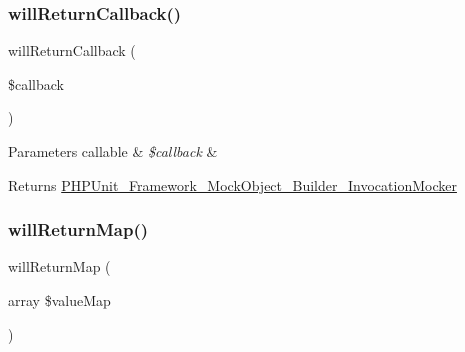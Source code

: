 \subsubsection{\texorpdfstring{will\+Return\+Callback()}{willReturnCallback()}}
{\footnotesize\ttfamily will\+Return\+Callback (\begin{DoxyParamCaption}\item[{}]{\$callback }\end{DoxyParamCaption})}


\begin{DoxyParams}[1]{Parameters}
callable & {\em \$callback} & \\
\hline
\end{DoxyParams}
\begin{DoxyReturn}{Returns}
\mbox{\hyperlink{class_p_h_p_unit___framework___mock_object___builder___invocation_mocker}{P\+H\+P\+Unit\+\_\+\+Framework\+\_\+\+Mock\+Object\+\_\+\+Builder\+\_\+\+Invocation\+Mocker}} 
\end{DoxyReturn}
\mbox{\label{class_p_h_p_unit___framework___mock_object___builder___invocation_mocker_ab34703c589f8f81162ac0023eabb6a76}} 
\subsubsection{\texorpdfstring{will\+Return\+Map()}{willReturnMap()}}
{\footnotesize\ttfamily will\+Return\+Map (\begin{DoxyParamCaption}\item[{array}]{\$value\+Map }\end{DoxyParamCaption})}


